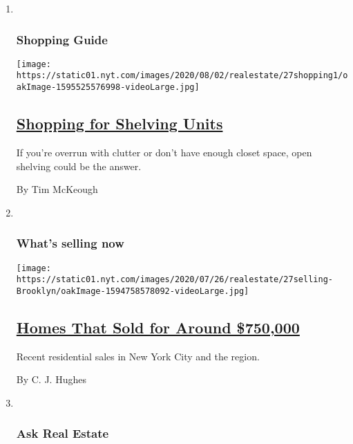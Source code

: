 \begin{enumerate}
\def\labelenumi{\arabic{enumi}.}
\item ~
  \hypertarget{shopping-guide}{%
  \subsubsection{Shopping Guide}\label{shopping-guide}}

  \texttt{[image: https://static01.nyt.com/images/2020/08/02/realestate/27shopping1/oakImage-1595525576998-videoLarge.jpg]}

  \hypertarget{shopping-for-shelving-units}{%
  \subsection{\texorpdfstring{\href{/2020/07/27/realestate/shopping-for-shelving-units.html}{Shopping
  for Shelving
  Units}}{Shopping for Shelving Units}}\label{shopping-for-shelving-units}}

  If you're overrun with clutter or don't have enough closet space, open
  shelving could be the answer.

  By Tim McKeough
\item ~
  \hypertarget{whats-selling-now}{%
  \subsubsection{What's selling now}\label{whats-selling-now}}

  \texttt{[image: https://static01.nyt.com/images/2020/07/26/realestate/27selling-Brooklyn/oakImage-1594758578092-videoLarge.jpg]}

  \hypertarget{homes-that-sold-for-around-750000}{%
  \subsection{\texorpdfstring{\href{/2020/07/26/realestate/homes-that-sold-for-around-750000.html}{Homes
  That Sold for Around
  \$750,000}}{Homes That Sold for Around \$750,000}}\label{homes-that-sold-for-around-750000}}

  Recent residential sales in New York City and the region.

  By C. J. Hughes
\item ~
  \hypertarget{ask-real-estate}{%
  \subsubsection{Ask Real Estate}\label{ask-real-estate}}


\end{enumerate}
